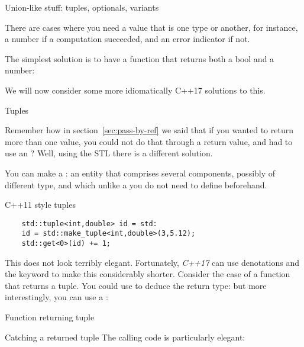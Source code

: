  {Union-like stuff: tuples, optionals, variants}

There are cases where you need a value that is one type or another,
for instance, a number if a computation succeeded, and an error
indicator if not.

The simplest solution is to have a function that returns both a bool
and a number:
%

We will now consider some more idiomatically C++17 solutions to this.

 {Tuples}
\label{sec:tuple}

Remember how in section~\ref{sec:pass-by-ref} we said that if you
wanted to return more than one value, you could not do that through a
return value, and had to use an ?
Well, using the \ac{STL} there is a different solution.

You can make a : an entity that comprises several
components, possibly of different type, and which unlike a
 you do not need to define beforehand.

\lstset{style=reviewcode,language=C++}
\begin{block}{C++11 style tuples}
  \label{sl:tuple11}
  \begin{lstlisting}
    std::tuple<int,double> id = std:
    id = std::make_tuple<int,double>(3,5.12);
    std::get<0>(id) += 1;
  \end{lstlisting}
\end{block}

This does not look terribly elegant. Fortunately,
\emph{C++17} can use denotations and the 
keyword to make this considerably shorter. Consider the case of a
function that returns a tuple. You could use  to deduce the
return type:
%
%
but more interestingly, you can use a
:
%

\begin{slide}{Function returning tuple}
  \label{sl:tuplefun}
  \begin{multicols}{2}
    \columnbreak
  \end{multicols}
\end{slide}

\begin{block}{Catching a returned tuple}
  \label{sl:catch-tuple}
  The calling code is particularly elegant:
\end{block}

